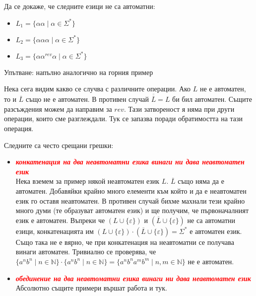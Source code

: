 \pagebreak

\begin{problem}
Да се докаже, че следните езици не са автоматни:
\begin{itemize}
    \item $L_1 = \{ \alpha \alpha \mid \alpha \in \Sigma^* \}$
    \item $L_2 = \{ \alpha \alpha \alpha \mid \alpha \in \Sigma^* \}$
    \item $L_3 = \{ \alpha \alpha^{rev} \alpha \mid \alpha \in \Sigma^* \}$
\end{itemize}
Упътване: напълно аналогично на горния пример
\end{problem}

Нека сега видим какво се случва с различните операции.
Ако $L$ не е автоматен, то и $\overline{L}$ също не е автоматен.
В противен случай $\overline{\overline{L}} = L$ би бил автоматен.
Същите разсъждения можем да направим за $rev$.
Тази затвореност я няма при други операции, които сме разглеждали.
Тук се запазва поради обратимостта на тази операция.

\begin{warning}
    Следните са често срещани грешки:
    \begin{itemize}
        \item \textbf{\textit{\textcolor{red}{конкатенация на два неавтоматни езика винаги ни дава неавтоматен език}}} \\
              Нека вземем за пример някой неавтоматен език $L$.
              $\overline{L}$ също няма да е автоматен.
              Добавяйки крайно много елементи към който и да е неавтоматен език го оставя неавтоматен.
              В противен случай бихме махнали тези крайно много думи (те образуват автоматен език) и ще получим, че първоначалният език е автоматен.
              Въпреки че $(L \cup \{ \varepsilon \})$ и $(\overline{L} \cup \{ \varepsilon \})$ не са автоматни езици,
              конкатенацията им $(L \cup \{ \varepsilon \}) \cdot (\overline{L} \cup \{ \varepsilon \}) = \Sigma^*$ е автоматен език.
              Също така не е вярно, че при конкатенация на неавтоматни се получава винаги автоматен.
              Тривиално се проверява, че $\{ a^nb^n \mid n \in \mathbb{N} \} \cdot \{ a^nb^n \mid n \in \mathbb{N} \} = \{ a^nb^na^mb^m \mid n, m \in \mathbb{N} \}$ не е автоматен.

        \item \textbf{\textit{\textcolor{red}{обединение на два неавтоматни езика винаги ни дава неавтоматен език}}} \\
              Абсолютно същите примери вършат работа и тук.
    \end{itemize}
\end{warning}
